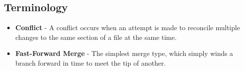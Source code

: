 \subsection{Terminology}
\begin{itemize}

\item\textbf{Conflict} - A conflict occurs when an attempt is made to reconcile multiple changes to the same section of a file at the same time.

\item\textbf{Fast-Forward Merge} - The simplest merge type, which simply winds a branch forward in time to meet the tip of another.

\end{itemize}
